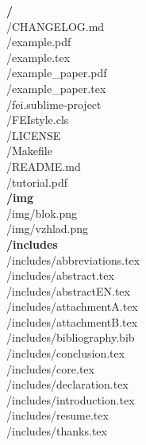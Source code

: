 \textbf{/} \\
/CHANGELOG.md \\
/example.pdf \\
/example.tex \\
/example\_paper.pdf \\
/example\_paper.tex \\
/fei.sublime-project \\
/FEIstyle.cls \\
/LICENSE \\
/Makefile \\
/README.md \\
/tutorial.pdf \\
\textbf{/img} \\
/img/blok.png \\
/img/vzhlad.png \\
\textbf{/includes} \\
/includes/abbreviations.tex \\
/includes/abstract.tex \\
/includes/abstractEN.tex \\
/includes/attachmentA.tex \\
/includes/attachmentB.tex \\
/includes/bibliography.bib \\
/includes/conclusion.tex \\
/includes/core.tex \\
/includes/declaration.tex \\
/includes/introduction.tex \\
/includes/resume.tex \\
/includes/thanks.tex \\
